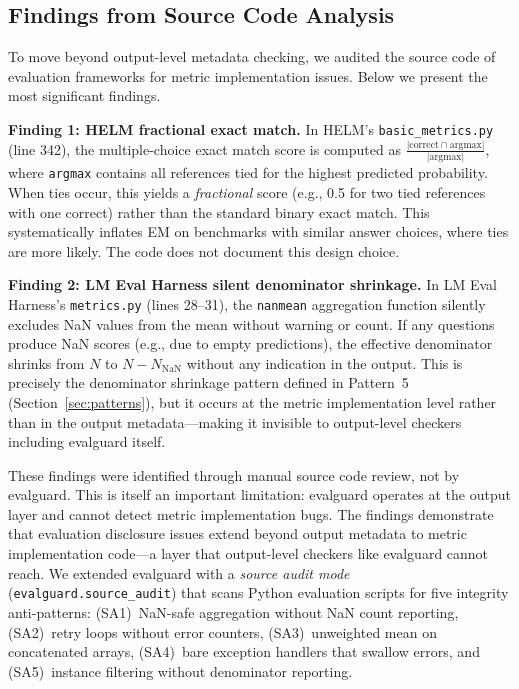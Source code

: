 \documentclass[11pt]{article}
\begin{document}
\subsection{Findings from Source Code Analysis}
\label{sec:source_audit}

To move beyond output-level metadata checking, we audited the source code of evaluation frameworks for metric implementation issues. Below we present the most significant findings.

\textbf{Finding 1: HELM fractional exact match.} In HELM's \texttt{basic\_metrics.py} (line 342), the multiple-choice exact match score is computed as $\frac{|\text{correct} \cap \text{argmax}|}{|\text{argmax}|}$, where \texttt{argmax} contains all references tied for the highest predicted probability. When ties occur, this yields a \emph{fractional} score (e.g., 0.5 for two tied references with one correct) rather than the standard binary exact match. This systematically inflates EM on benchmarks with similar answer choices, where ties are more likely. The code does not document this design choice.

\textbf{Finding 2: LM Eval Harness silent denominator shrinkage.} In LM Eval Harness's \texttt{metrics.py} (lines 28--31), the \texttt{nanmean} aggregation function silently excludes NaN values from the mean without warning or count. If any questions produce NaN scores (e.g., due to empty predictions), the effective denominator shrinks from $N$ to $N - N_{\text{NaN}}$ without any indication in the output. This is precisely the denominator shrinkage pattern defined in Pattern~5 (Section~\ref{sec:patterns}), but it occurs at the metric implementation level rather than in the output metadata---making it invisible to output-level checkers including evalguard itself.

These findings were identified through manual source code review, not by evalguard. This is itself an important limitation: evalguard operates at the output layer and cannot detect metric implementation bugs. The findings demonstrate that evaluation disclosure issues extend beyond output metadata to metric implementation code—a layer that output-level checkers like evalguard cannot reach. We extended evalguard with a \emph{source audit mode} (\texttt{evalguard.source\_audit}) that scans Python evaluation scripts for five integrity anti-patterns: (SA1)\ NaN-safe aggregation without NaN count reporting, (SA2)\ retry loops without error counters, (SA3)\ unweighted mean on concatenated arrays, (SA4)\ bare exception handlers that swallow errors, and (SA5)\ instance filtering without denominator reporting.
\end{document}

